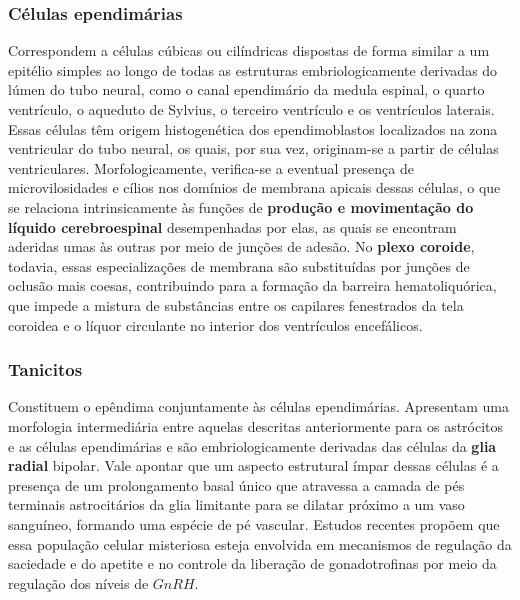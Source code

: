 \documentclass[
]{book}
\begin{document}
\hypertarget{cuxe9lulas-ependimuxe1rias}{%
\subsubsection*{Células ependimárias}\label{cuxe9lulas-ependimuxe1rias}}

Correspondem a células cúbicas ou cilíndricas dispostas de forma similar a um epitélio simples ao longo de todas as estruturas embriologicamente derivadas do lúmen do tubo neural, como o canal ependimário da medula espinal, o quarto ventrículo, o aqueduto de Sylvius, o terceiro ventrículo e os ventrículos laterais. Essas células têm origem histogenética dos ependimoblastos localizados na zona ventricular do tubo neural, os quais, por sua vez, originam-se a partir de células ventriculares. Morfologicamente, verifica-se a eventual presença de microvilosidades e cílios nos domínios de membrana apicais dessas células, o que se relaciona intrinsicamente às funções de \textbf{produção e movimentação do líquido cerebroespinal} desempenhadas por elas, as quais se encontram aderidas umas às outras por meio de junções de adesão. No \textbf{plexo coroide}, todavia, essas especializações de membrana são substituídas por junções de oclusão mais coesas, contribuindo para a formação da barreira hematoliquórica, que impede a mistura de substâncias entre os capilares fenestrados da tela coroidea e o líquor circulante no interior dos ventrículos encefálicos.

\hypertarget{tanicitos}{%
\subsubsection*{Tanicitos}\label{tanicitos}}

Constituem o epêndima conjuntamente às células ependimárias. Apresentam uma morfologia intermediária entre aquelas descritas anteriormente para os astrócitos e as células ependimárias e são embriologicamente derivadas das células da \textbf{glia radial} bipolar. Vale apontar que um aspecto estrutural ímpar dessas células é a presença de um prolongamento basal único que atravessa a camada de pés terminais astrocitários da glia limitante para se dilatar próximo a um vaso sanguíneo, formando uma espécie de pé vascular. Estudos recentes propõem que essa população celular misteriosa esteja envolvida em mecanismos de regulação da saciedade e do apetite e no controle da liberação de gonadotrofinas por meio da regulação dos níveis de \(GnRH\).
\end{document}
